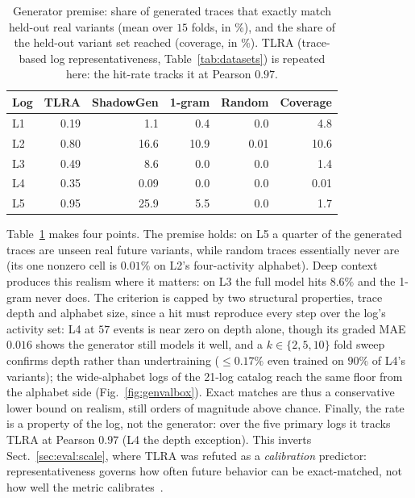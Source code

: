 \documentclass[runningheads]{llncs}
\begin{document}
\begin{table}[t]
\centering
\caption{Generator premise: share of generated traces that exactly match held-out real variants (mean over $15$ folds, in \%), and the share of the held-out variant set reached (coverage, in \%). TLRA (trace-based log representativeness, Table~\ref{tab:datasets}) is repeated here: the hit-rate tracks it at Pearson $0.97$.}
\label{tab:genval}
\setlength{\tabcolsep}{5pt}
\footnotesize
\begin{tabular}{@{}lrrrrr@{}}
\toprule
Log & TLRA & ShadowGen & 1-gram & Random & Coverage \\
\midrule
L1 & 0.19 & 1.1 & 0.4 & 0.0 & 4.8 \\
L2 & 0.80 & 16.6 & 10.9 & 0.01 & 10.6 \\
L3 & 0.49 & 8.6 & 0.0 & 0.0 & 1.4 \\
L4 & 0.35 & 0.09 & 0.0 & 0.0 & 0.01 \\
L5 & 0.95 & 25.9 & 5.5 & 0.0 & 1.7 \\
\bottomrule
\end{tabular}
\end{table}

Table~\ref{tab:genval} makes four points. The premise holds: on L5 a quarter of the generated traces are unseen real future variants, while random traces essentially never are (its one nonzero cell is $0.01\%$ on L2's four-activity alphabet). Deep context produces this realism where it matters: on L3 the full model hits $8.6\%$ and the 1-gram never does. The criterion is capped by two structural properties, trace depth and alphabet size, since a hit must reproduce every step over the log's activity set: L4 at $57$ events is near zero on depth alone, though its graded MAE $0.016$ shows the generator still models it well, and a $k\in\{2,5,10\}$ fold sweep confirms depth rather than undertraining ($\le0.17\%$ even trained on $90\%$ of L4's variants); the wide-alphabet logs of the 21-log catalog reach the same floor from the alphabet side (Fig.~\ref{fig:genvalbox}). Exact matches are thus a conservative lower bound on realism, still orders of magnitude above chance. Finally, the rate is a property of the log, not the generator: over the five primary logs it tracks TLRA at Pearson $0.97$ (L4 the depth exception). This inverts Sect.~\ref{sec:eval:scale}, where TLRA was refuted as a \emph{calibration} predictor: representativeness governs how often future behavior can be exact-matched, not how well the metric calibrates~\cite{karunaratne2024representativeness}.
\end{document}
